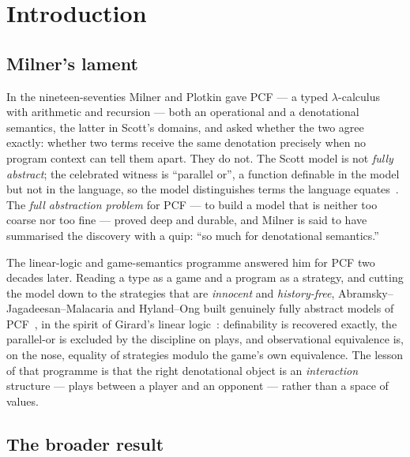 \documentclass[11pt]{article}
\theoremstyle{plain}
\theoremstyle{definition}
\theoremstyle{remark}
\begin{document}
\tableofcontents

\section{Introduction}\label{sec:intro}

\subsection{Milner's lament}

In the nineteen-seventies Milner and Plotkin gave PCF --- a typed $\lambda$-calculus with arithmetic
and recursion --- both an operational and a denotational semantics, the latter in Scott's domains,
and asked whether the two agree exactly: whether two terms receive the same denotation precisely when
no program context can tell them apart. They do not. The Scott model is not \emph{fully abstract};
the celebrated witness is ``parallel or'', a function definable in the model but not in the language,
so the model distinguishes terms the language equates~\cite{milnerfa,plotkinlcf,scottdomains}. The
\emph{full abstraction problem} for PCF --- to build a model that is neither too coarse nor too fine
--- proved deep and durable, and Milner is said to have summarised the discovery with a quip: ``so
much for denotational semantics.''

The linear-logic and game-semantics programme answered him for PCF two decades later. Reading a type
as a game and a program as a strategy, and cutting the model down to the strategies that are
\emph{innocent} and \emph{history-free}, Abramsky--Jagadeesan--Malacaria and Hyland--Ong built
genuinely fully abstract models of PCF~\cite{ajm,ho}, in the spirit of Girard's linear
logic~\cite{girardll}: definability is recovered exactly, the parallel-or is excluded by the
discipline on plays, and observational equivalence is, on the nose, equality of strategies modulo the
game's own equivalence. The lesson of that programme is that the right denotational object is an
\emph{interaction} structure --- plays between a player and an opponent --- rather than a space of
values.

\subsection{The broader result}
\end{document}
